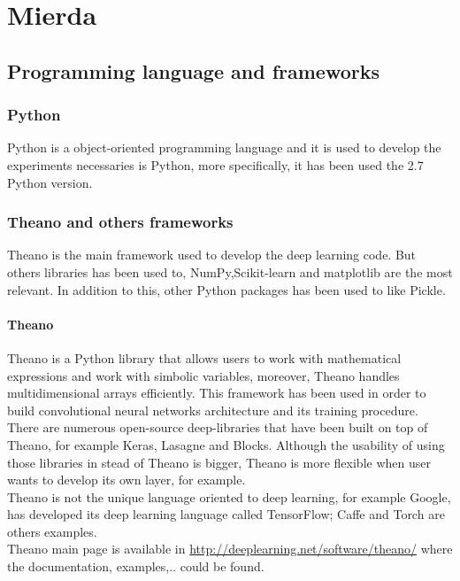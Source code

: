 \chapter{Mierda}
\section{Programming language and frameworks}

\subsection{Python}
Python is a  object-oriented programming language and it is used to develop the experiments necessaries is Python, more specifically, it has been used the 2.7 Python version.

\subsection{Theano and others frameworks}
Theano is the main framework used to develop the deep learning code. But others libraries has been used to, NumPy,Scikit-learn and matplotlib are the most relevant. In addition to this, other Python packages has been used to like Pickle.
 
\subsubsection{Theano}
Theano \cite{theano} is a Python library that allows users to work with mathematical expressions and work with simbolic variables, moreover, Theano handles multidimensional arrays efficiently. This framework has been used in order to build convolutional neural networks architecture and its training procedure.\\

There are numerous open-source deep-libraries that have been built on top of Theano, for example Keras, Lasagne and Blocks. Although the usability of using those libraries in stead of Theano is bigger, Theano is more flexible when user wants to develop its own layer, for example.\\

Theano is not the unique language oriented to deep learning, for example Google, has developed its deep learning language called TensorFlow; Caffe and Torch are others examples.\\

Theano main page is available in \url{http://deeplearning.net/software/theano/} where the documentation, examples,.. could be found.\\

